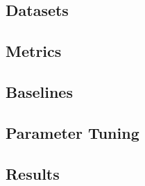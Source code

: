 \subsection{Datasets}


\subsection{Metrics}

\subsection{Baselines}

\subsection{Parameter Tuning}

\subsection{Results}